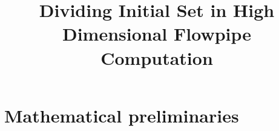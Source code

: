 


\title{Dividing Initial Set in High Dimensional Flowpipe Computation}
\author{}
\institute{}
%

\maketitle

\section{Mathematical preliminaries}






